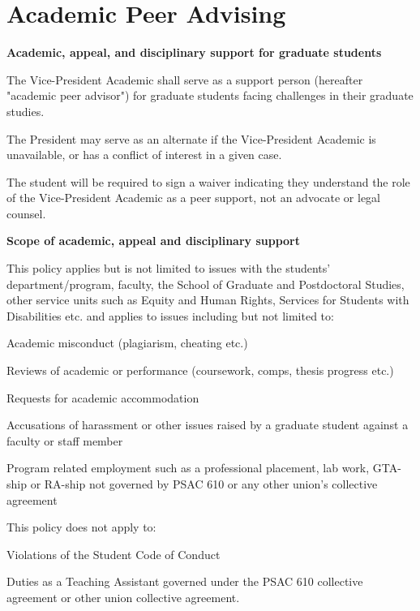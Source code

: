 \section{Academic Peer Advising}
\textbf{Academic, appeal, and disciplinary support for graduate students}
\begin{longenum}
\item The Vice-President Academic shall serve as a support person (hereafter "academic peer advisor") for graduate students facing challenges in their graduate studies.
\begin{longenum}
\item The President may serve as an alternate if the Vice-President Academic is unavailable, or has a conflict of interest in a given case.
\item The student will be required to sign a waiver indicating they understand the role of the Vice-President Academic as a peer support, not an advocate or legal counsel.
\end{longenum}

\textbf{Scope of academic, appeal and disciplinary support}
\item This policy applies but is not limited to issues with the students' department/program, faculty, the School of Graduate and Postdoctoral Studies, other service units such as Equity and Human Rights, Services for Students with Disabilities etc. and applies to issues including but not limited to:
\begin{longenum}
\item Academic misconduct (plagiarism, cheating etc.)
\item Reviews of academic or performance (coursework, comps, thesis progress etc.)
\item Requests for academic accommodation
\item Accusations of harassment or other issues raised by a graduate student against a faculty or
staff member
\item Program related employment such as a professional placement, lab work, GTA-ship or RA-ship
not governed by PSAC 610 or any other union's collective agreement
\end{longenum}
\item This policy does not apply to:
\begin{longenum}
\item Violations of the Student Code of Conduct
\item Duties as a Teaching Assistant governed under the PSAC 610 collective agreement or other
union collective agreement.
\end{longenum}


\end{longenum}
